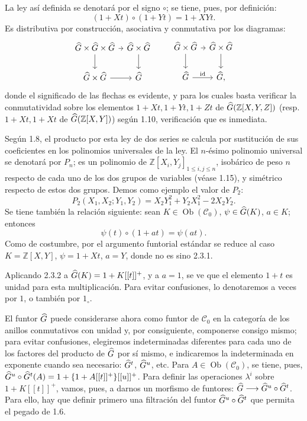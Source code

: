 La ley así definida se denotará por el signo \(\circ\); se tiene, pues, por definición:
\begin{equation}\tag{2.3.1}
  (1+Xt)\circ(1+Yt)=1+XYt.
\end{equation}
Es distributiva por construcción, asociativa y conmutativa por los diagramas:
\[
\begin{tikzcd}[column sep=tiny]
\Ghat\times\Ghat\times\Ghat \arrow[r] \arrow[d] &
\Ghat\times\Ghat \arrow[d]\\
\Ghat\times\Ghat \arrow[r] & \Ghat
\end{tikzcd}
\qquad
\begin{tikzcd}[column sep=tiny]
\Ghat\times\Ghat \arrow[r] \arrow[d] &
\Ghat\times\Ghat \arrow[d]\\
\Ghat \arrow[r,"\id"] & \Ghat,
\end{tikzcd}
\]
donde el significado de las flechas es evidente, y para los cuales basta verificar la conmutatividad sobre los elementos \(1+Xt,1+Yt,1+Zt\) de \(\widehat G(\mathbb Z[X,Y,Z])\) (resp. \(1+Xt,1+Xt\) de \(\widehat G(\mathbb Z[X,Y])\)) según 1.10, verificación que es inmediata.

Según 1.8, el producto por esta ley de dos series se calcula por sustitución de sus coeficientes en los polinomios universales de la ley. El \(n\)-ésimo polinomio universal se denotará por \(P_n\); es un polinomio de \(\mathbb Z[X_i,Y_j]_{1\leq i,j\leq n}\), isobárico de peso \(n\) respecto de cada uno de los dos grupos de variables (véase 1.15), y simétrico respecto de estos dos grupos. Demos como ejemplo el valor de \(P_2\):
\[
  P_2(X_1,X_2;Y_1,Y_2)=X_2Y_1^2+Y_2X_1^2-2X_2Y_2.
\]
Se tiene también la relación siguiente: sean \(K\in\operatorname{Ob}(\mathcal C_0)\), \(\psi\in\widehat G(K)\), \(a\in K\); entonces
\begin{equation}\tag{2.3.2}
  \psi(t)\circ(1+at)=\psi(at).
\end{equation}
Como de costumbre, por el argumento funtorial estándar se reduce al caso \(K=\mathbb Z[X,Y]\), \(\psi=1+Xt\), \(a=Y\), donde no es sino 2.3.1.

Aplicando 2.3.2 a \(\widehat G(K)=1+K[[t]]^+\), y a \(a=1\), se ve que el elemento \(1+t\) es unidad para esta multiplicación. Para evitar confusiones, lo denotaremos a veces por \(1\), o también por \(1_\circ\).

El funtor \(\widehat G\) puede considerarse ahora como funtor de \(\mathcal C_0\) en la categoría de los anillos conmutativos con unidad y, por consiguiente, componerse consigo mismo; para evitar confusiones, elegiremos indeterminadas diferentes para cada uno de los factores del producto de \(\widehat G\) por sí mismo, e indicaremos la indeterminada en exponente cuando sea necesario: \(\widehat G^t\), \(\widehat G^u\), etc. Para \(A\in\operatorname{Ob}(\mathcal C_0)\), se tiene, pues, \(\widehat G^u\circ\widehat G^t(A)=1+\{1+A[[t]]^+\}[[u]]^+\). Para definir las operaciones \(\lambda^i\) sobre \(1+K[[t]]^+\), vamos, pues, a darnos un morfismo de funtores: \(\widehat G\longrightarrow\widehat G^u\circ\widehat G^t\).
Para ello, hay que definir primero una filtración del funtor \(\widehat G^u\circ\widehat G^t\) que permita el pegado de 1.6.

